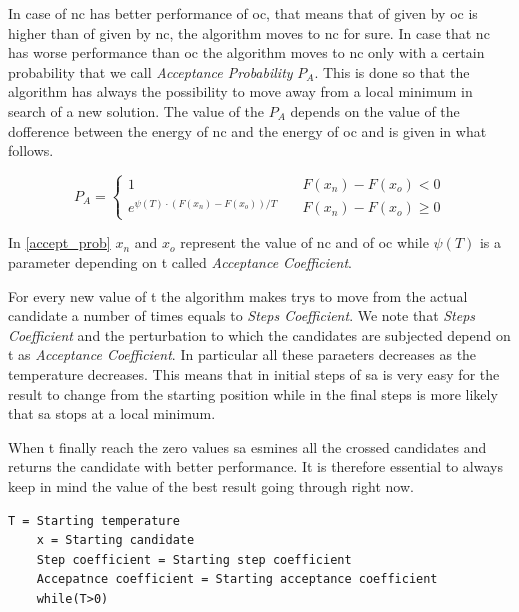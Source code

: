 \documentclass[journal]{IEEEtran}
\begin{document}
 In case of \gls{nc} has better performance of \gls{oc}, that means that \gls{of} given by \gls{oc} is higher than \gls{of} given by \gls{nc}, the algorithm moves to \gls{nc} for sure. In case that \gls{nc} has worse performance than \gls{oc} the algorithm moves to \gls{nc} only with a certain probability that we call \textit{Acceptance Probability} $P_A$. This is done so that the algorithm has always the possibility to move away from a local minimum in search of a new solution. The value of the $P_A$ depends on the value of the dofference between the energy of \gls{nc} and the energy of \gls{oc} and is given in what follows.

 \begin{equation}
 	\label{accept_prob}
	P_A = \begin{cases}
		1 & \quad F(x_n)-F(x_o) < 0 \\
		e^{\psi(T)\cdot(F(x_n)-F(x_o))/T } & \quad F(x_n)-F(x_o) \geq 0
\end{cases}
 \end{equation}

In \ref{accept_prob} $x_n$ and $x_o$ represent the value of \gls{nc} and of \gls{oc} while $\psi(T)$ is a parameter depending on \gls{t} called \textit{Acceptance Coefficient}.

For every new value of \gls{t} the algorithm makes trys to move from the actual candidate a number of times equals to \textit{Steps Coefficient}. We note that \textit{Steps Coefficient} and the perturbation to which the candidates are subjected depend on \gls{t} as \textit{Acceptance Coefficient}. In particular all these paraeters decreases as the temperature decreases. This means that in initial steps of \gls{sa} is very easy for the result to change from the starting position while in the final steps is more likely that \gls{sa} stops at a local minimum.

When \gls{t} finally reach the zero values \gls{sa} esmines all the crossed candidates and returns the candidate with better performance.
It is therefore essential to always keep in mind the value of the best result going through right now.

\begin{lstlisting}[frame=single]
	T = Starting temperature
	x = Starting candidate
	Step coefficient = Starting step coefficient
	Accepatnce coefficient = Starting acceptance coefficient
	while(T>0)

\end{lstlisting}
\end{document}
